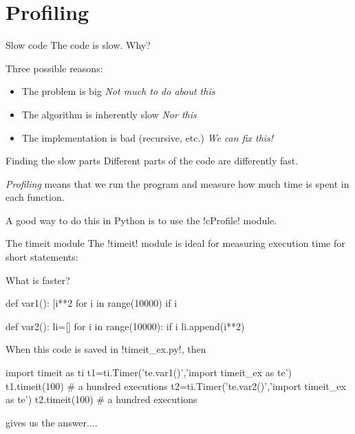 \documentclass[hyperref={pdfpagelabels=false},table, handout]{beamer}
\begin{document}
\section{Profiling}


\begin{frame}[fragile]{Slow code}
The code is slow. Why?

\vfill

Three possible reasons:
\begin{itemize}
\item The problem is big \hfill \emph{Not much to do about this}
\item The algorithm is inherently slow \hfill \emph{Nor this}
\item The implementation is bad (recursive, etc.) \hfill \emph{We can fix this!}
\end{itemize}
\end{frame}

\begin{frame}[fragile]{Finding the slow parts}
Different parts of the code are differently fast.

\vfill

\emph{Profiling} means that we run the program and measure how much time is spent in each function.

\vfill

A good way to do this in Python is to use the \pyth!cProfile! module.

\end{frame}

\begin{frame}[fragile]{The timeit module}
The \pyth!timeit! module is ideal for measuring execution time for short statements:

\vfill
 What is faster?
\begin{python}
def var1():
   [i**2 for i in range(10000) if i%
     
def var2():
   li=[]
   for i in range(10000):
      if i%
          li.append(i**2)
\end{python}

When this code is saved in \pyth!timeit_ex.py!, then

\begin{python}
import timeit as ti
t1=ti.Timer('te.var1()','import timeit_ex as te')
t1.timeit(100) # a hundred executions
t2=ti.Timer('te.var2()','import timeit_ex as te')
t2.timeit(100) # a hundred executions
\end{python}

gives us the answer....

\vfill

\end{frame}
\end{document}
